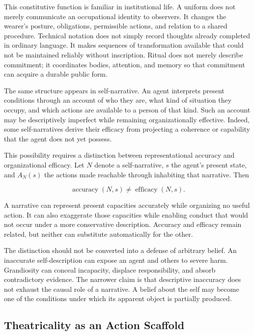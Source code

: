 \documentclass[11pt]{article}
\begin{document}
This constitutive function is familiar in institutional life. A uniform does
not merely communicate an occupational identity to observers. It changes the
wearer's posture, obligations, permissible actions, and relation to a shared
procedure. Technical notation does not simply record thoughts already
completed in ordinary language. It makes sequences of transformation
available that could not be maintained reliably without inscription. Ritual
does not merely describe commitment; it coordinates bodies, attention, and
memory so that commitment can acquire a durable public form.

The same structure appears in self-narrative. An agent interprets present
conditions through an account of who they are, what kind of situation they
occupy, and which actions are available to a person of that kind. Such an
account may be descriptively imperfect while remaining organizationally
effective. Indeed, some self-narratives derive their efficacy from projecting
a coherence or capability that the agent does not yet possess.

This possibility requires a distinction between representational accuracy and
organizational efficacy. Let \(N\) denote a self-narrative, \(s\) the agent's
present state, and \(A_N(s)\) the actions made reachable through inhabiting
that narrative. Then

\begin{equation}
  \operatorname{accuracy}(N,s)
  \neq
  \operatorname{efficacy}(N,s).
  \label{eq:accuracy-efficacy}
\end{equation}

A narrative can represent present capacities accurately while organizing no
useful action. It can also exaggerate those capacities while enabling conduct
that would not occur under a more conservative description. Accuracy and
efficacy remain related, but neither can substitute automatically for the
other.

The distinction should not be converted into a defense of arbitrary belief.
An inaccurate self-description can expose an agent and others to severe
harm. Grandiosity can conceal incapacity, displace responsibility, and absorb
contradictory evidence. The narrower claim is that descriptive inaccuracy
does not exhaust the causal role of a narrative. A belief about the self may
become one of the conditions under which its apparent object is partially
produced.

\subsection{Theatricality as an Action Scaffold}
\end{document}
